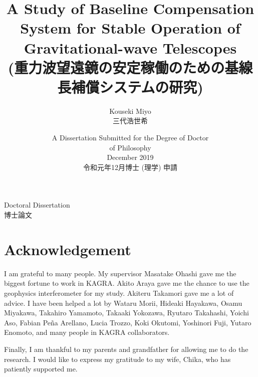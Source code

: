 \documentclass[a4paper,oneside,12pt,openleft]{book}
\title{{\bf A Study of Baseline Compensation System for Stable Operation of Gravitational-wave Telescopes}\\ (重力波望遠鏡の安定稼働のための基線長補償システムの研究)}
\author{Kouseki Miyo\\三代浩世希}
\date{A Dissertation Submitted for the Degree of Doctor \\of Philosophy\\
  \vspace{2mm} December 2019\\
  令和元年12月博士 (理学) 申請}
\makeatletter
\def\maketitle{
  \begin{center}
    \huge \@thesis \par
    \vspace{4mm} 
           {\LARGE \@title \par}
    \vspace{4mm}            
    \LARGE\@date\par
    \vspace{4mm}                
    \LARGE\@department\par
    \vspace{4mm}
    \LARGE\@author
  \end{center}
}
\def\@thesis{Doctoral Dissertation\\博士論文}
\makeatother
\begin{document}
\thispagestyle{empty}
\maketitle
\setcounter{tocdepth}{2}

%
\chapter*{Acknowledgement}
I am grateful to many people. My supervisor Masatake Ohashi gave me the biggest fortune to work in KAGRA. Akito Araya gave me the chance to use the geophysics interferometer for my study. Akiteru Takamori gave me a lot of advice. I have been helped a lot by Wataru Morii, Hideaki Hayakawa, Osamu Miyakawa, Takahiro Yamamoto, Takaaki Yokozawa, Ryutaro Takahashi, Yoichi Aso, Fabian Pe\~{n}a Arellano, Lucia Trozzo, Koki Okutomi, Yoshinori Fuji, Yutaro Enomoto, and many people in KAGRA collaborators. 

Finally, I am thankful to my parents and grandfather for allowing me to do the research. I would like to express my gratitude to my wife, Chika, who has patiently supported me.
\clearpage
\tableofcontents
\appendix
 

\clearpage


\end{document}
